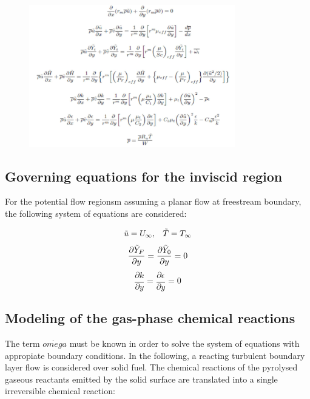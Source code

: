\documentclass[12pt]{article}
\begin{document}
\begin{figure}[!ht]
\centering
\includegraphics[width=0.8\textwidth]{figures/turbulent.png}
\end{figure}

\subsection{Governing equations for the inviscid region}

For the potential flow regionsm assuming a planar flow at freestream boundary, the following system of equations are considered:

\begin{equation}
    \Tilde{u} = U_{\infty}, \;\;\; \Tilde{T}=T_{\infty}
\end{equation}
\begin{equation}
    \frac{\partial \Tilde{Y}_{F}}{\partial y} =  \frac{\partial \Tilde{Y}_{0}}{\partial y} = 0
\end{equation}
\begin{equation}
    \frac{\partial k}{\partial y} = \frac{\partial \epsilon}{\partial y} = 0
\end{equation}

\subsection{Modeling of the gas-phase chemical reactions}

The term $\dot{omega}$ must be known in order to solve the system of equations with appropiate boundary conditions. In the following, a reacting turbulent boundary layer flow is considered over solid fuel. The chemical reactions of the pyrolysed gaseous reactants emitted by the solid surface are translated into a single irreversible chemical reaction:
\end{document}
